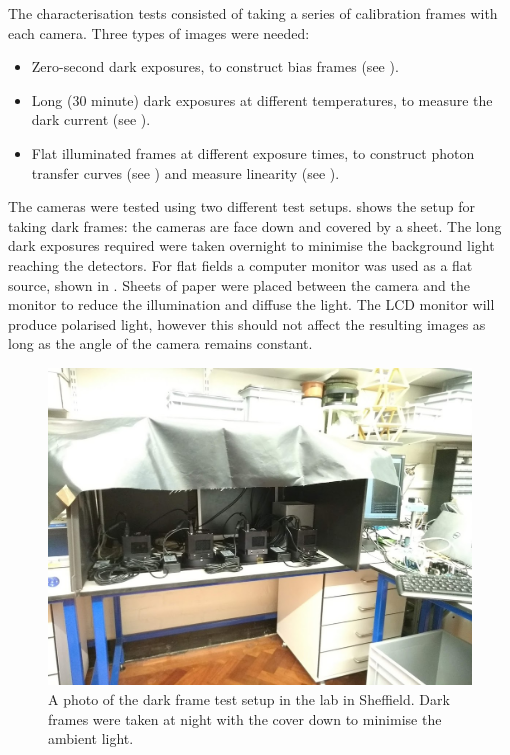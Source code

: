 \begin{colsection}
The characterisation tests consisted of taking a series of calibration frames with each camera. Three types of images were needed:

\begin{itemize}
    \item Zero-second dark exposures, to construct bias frames (see ).
    \item Long (30 minute) dark exposures at different temperatures, to measure the dark current (see ).
    \item Flat illuminated frames at different exposure times, to construct photon transfer curves (see ) and measure linearity (see ).
\end{itemize}

The cameras were tested using two different test setups.  shows the setup for taking dark frames: the cameras are face down and covered by a sheet. The long dark exposures required were taken overnight to minimise the background light reaching the detectors. For flat fields a computer monitor was used as a flat source, shown in . Sheets of paper were placed between the camera and the monitor to reduce the illumination and diffuse the light. The LCD monitor will produce polarised light, however this should not affect the resulting images as long as the angle of the camera remains constant.

\begin{figure}[p]
    \begin{center}
        \includegraphics[width=0.75\linewidth]{images/dark_photo.jpg}
    \end{center}
    \caption[The dark frame test setup]{
        A photo of the dark frame test setup in the lab in Sheffield. Dark frames were taken at night with the cover down to minimise the ambient light.
    }\label{fig:dark_photo}
\end{figure}


\end{colsection}
